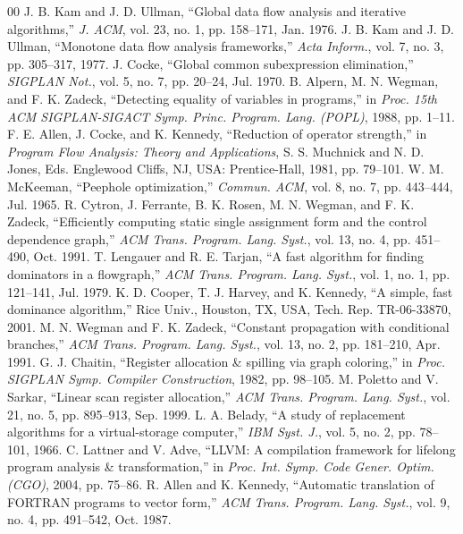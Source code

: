 \documentclass[conference]{IEEEtran}
\begin{document}
\begin{thebibliography}{00}
 J. B. Kam and J. D. Ullman, ``Global data flow analysis and iterative algorithms,'' \emph{J. ACM}, vol. 23, no. 1, pp. 158--171, Jan. 1976.
 J. B. Kam and J. D. Ullman, ``Monotone data flow analysis frameworks,'' \emph{Acta Inform.}, vol. 7, no. 3, pp. 305--317, 1977.
 J. Cocke, ``Global common subexpression elimination,'' \emph{SIGPLAN Not.}, vol. 5, no. 7, pp. 20--24, Jul. 1970.
 B. Alpern, M. N. Wegman, and F. K. Zadeck, ``Detecting equality of variables in programs,'' in \emph{Proc. 15th ACM SIGPLAN-SIGACT Symp. Princ. Program. Lang. (POPL)}, 1988, pp. 1--11.
 F. E. Allen, J. Cocke, and K. Kennedy, ``Reduction of operator strength,'' in \emph{Program Flow Analysis: Theory and Applications}, S. S. Muchnick and N. D. Jones, Eds. Englewood Cliffs, NJ, USA: Prentice-Hall, 1981, pp. 79--101.
 W. M. McKeeman, ``Peephole optimization,'' \emph{Commun. ACM}, vol. 8, no. 7, pp. 443--444, Jul. 1965.
 R. Cytron, J. Ferrante, B. K. Rosen, M. N. Wegman, and F. K. Zadeck, ``Efficiently computing static single assignment form and the control dependence graph,'' \emph{ACM Trans. Program. Lang. Syst.}, vol. 13, no. 4, pp. 451--490, Oct. 1991.
 T. Lengauer and R. E. Tarjan, ``A fast algorithm for finding dominators in a flowgraph,'' \emph{ACM Trans. Program. Lang. Syst.}, vol. 1, no. 1, pp. 121--141, Jul. 1979.
 K. D. Cooper, T. J. Harvey, and K. Kennedy, ``A simple, fast dominance algorithm,'' Rice Univ., Houston, TX, USA, Tech. Rep. TR-06-33870, 2001.
 M. N. Wegman and F. K. Zadeck, ``Constant propagation with conditional branches,'' \emph{ACM Trans. Program. Lang. Syst.}, vol. 13, no. 2, pp. 181--210, Apr. 1991.
 G. J. Chaitin, ``Register allocation \& spilling via graph coloring,'' in \emph{Proc. SIGPLAN Symp. Compiler Construction}, 1982, pp. 98--105.
 M. Poletto and V. Sarkar, ``Linear scan register allocation,'' \emph{ACM Trans. Program. Lang. Syst.}, vol. 21, no. 5, pp. 895--913, Sep. 1999.
 L. A. Belady, ``A study of replacement algorithms for a virtual-storage computer,'' \emph{IBM Syst. J.}, vol. 5, no. 2, pp. 78--101, 1966.
 C. Lattner and V. Adve, ``LLVM: A compilation framework for lifelong program analysis \& transformation,'' in \emph{Proc. Int. Symp. Code Gener. Optim. (CGO)}, 2004, pp. 75--86.
 R. Allen and K. Kennedy, ``Automatic translation of FORTRAN programs to vector form,'' \emph{ACM Trans. Program. Lang. Syst.}, vol. 9, no. 4, pp. 491--542, Oct. 1987.

\end{thebibliography}
\end{document}
